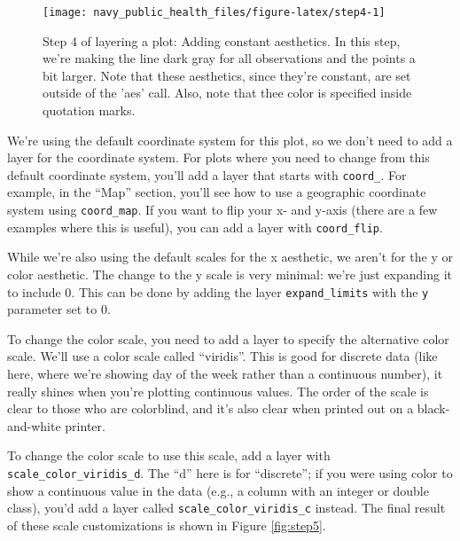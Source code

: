 \documentclass[]{tufte-book}
\begin{document}
\begin{figure}
\texttt{[image: navy\_public\_health\_files/figure-latex/step4-1]} \caption[Step 4 of layering a plot]{Step 4 of layering a plot: Adding constant aesthetics. In this step, we're making the line dark gray for all observations and the points a bit larger. Note that these aesthetics, since they're constant, are set outside of the 'aes' call. Also, note that thee color is specified inside quotation marks.}\label{fig:step4}
\end{figure}

We're using the default coordinate system for this plot, so we don't need to add
a layer for the coordinate system. For plots where you need to change from this
default coordinate system, you'll add a layer that starts with \texttt{coord\_}. For example,
in the ``Map'' section, you'll see how to use a geographic coordinate system using
\texttt{coord\_map}. If you want to flip your x- and y-axis (there are a few examples where
this is useful), you can add a layer with \texttt{coord\_flip}.

While we're also using the default scales for the x aesthetic, we aren't for
the y or color aesthetic. The change to the y scale is very minimal: we're just
expanding it to include 0. This can be done by adding the layer \texttt{expand\_limits}
with the \texttt{y} parameter set to 0.

To change the color scale, you need to add a layer to specify
the alternative color scale. We'll use a color scale called
``viridis''. This is good for discrete data (like here, where we're showing day of
the week rather than a continuous number), it really shines when you're plotting
continuous values. The order of the scale is clear to those who are colorblind, and
it's also clear when printed out on a black-and-white printer.

To change the color scale to use this scale, add a layer with \texttt{scale\_color\_viridis\_d}.
The ``d'' here is for ``discrete''; if you were using color to show a continuous
value in the data (e.g., a column with an integer or double class), you'd
add a layer called \texttt{scale\_color\_viridis\_c} instead. The final result of these
scale customizations is shown in Figure \ref{fig:step5}.
\end{document}
